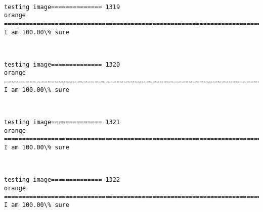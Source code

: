\documentclass[11pt]{article}
\begin{document}
    \begin{center}
    \end{center}
    { \hspace*{\fill} \\}
    
    \begin{Verbatim}[commandchars=\\\{\}]
testing image============== 1319
orange
============================================================================
I am 100.00\% sure

    \end{Verbatim}

    \begin{center}
    \end{center}
    { \hspace*{\fill} \\}
    
    \begin{Verbatim}[commandchars=\\\{\}]
testing image============== 1320
orange
============================================================================
I am 100.00\% sure

    \end{Verbatim}

    \begin{center}
    \end{center}
    { \hspace*{\fill} \\}
    
    \begin{Verbatim}[commandchars=\\\{\}]
testing image============== 1321
orange
============================================================================
I am 100.00\% sure

    \end{Verbatim}

    \begin{center}
    \end{center}
    { \hspace*{\fill} \\}
    
    \begin{Verbatim}[commandchars=\\\{\}]
testing image============== 1322
orange
============================================================================
I am 100.00\% sure

    \end{Verbatim}
\end{document}
